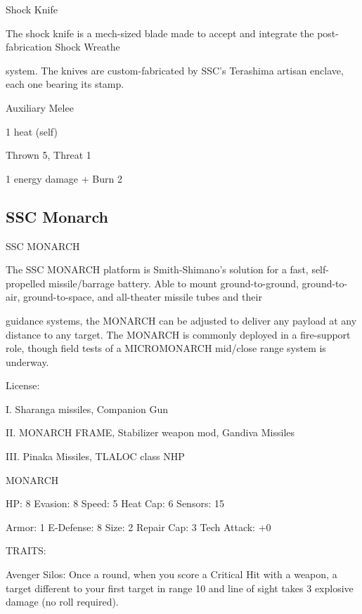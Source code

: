 Shock Knife
 
The shock knife is a mech-sized blade made to accept and integrate the post-fabrication Shock Wreathe  

system. The knives are custom-fabricated by SSC’s Terashima artisan enclave, each one bearing its stamp.  

Auxiliary Melee
 
1 heat (self)
 
Thrown 5, Threat 1
 
1 energy damage + Burn 2
 

                                                                                                               
\subsection{SSC Monarch}

                                             SSC MONARCH   

The SSC MONARCH platform is Smith-Shimano’s solution for a fast, self-propelled missile/barrage battery.  
Able to mount ground-to-ground, ground-to-air, ground-to-space, and all-theater missile tubes and their  

guidance systems, the MONARCH can be adjusted to deliver any payload at any distance to any target.  
The MONARCH is commonly deployed in a fire-support role, though field tests of a MICROMONARCH  
mid/close range system is underway. 
 
                                                     License:
 
I. Sharanga missiles, Companion Gun
 
II. MONARCH FRAME, Stabilizer weapon mod, Gandiva Missiles
 
III. Pinaka Missiles, TLALOC class NHP
 

                                                    MONARCH 

  HP: 8           Evasion: 8                             Speed: 5            Heat Cap: 6         Sensors: 15 

  Armor: 1        E-Defense: 8                           Size: 2             Repair Cap: 3       Tech Attack:  
                                                                                                 +0 

                                                      TRAITS: 

  Avenger Silos: Once a round, when you score a Critical Hit with a weapon, a target different to your  
  first target in range 10 and line of sight takes 3 explosive damage (no roll required).
 
